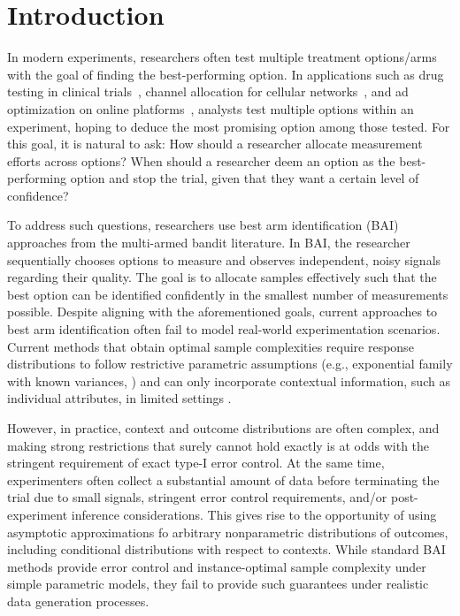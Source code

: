 \documentclass{article}
\begin{document}
\section{Introduction}\label{sec:Intro}

In modern experiments, researchers often test multiple treatment options/arms with the goal of finding the best-performing option. In applications such as drug testing in clinical trials~\citep{bai_healthcare}, channel allocation for cellular networks~\citep{bai}, and ad optimization on online platforms~\citep{bhattacharjee2023bestarmidentificationrare}, analysts test multiple options within an experiment, hoping to deduce the most promising option among those tested. For this goal, it is natural to ask: How should a researcher allocate measurement efforts across options? When should a researcher deem an option as the best-performing option and stop the trial, given that they want a certain level of confidence?

To address such questions, researchers use best arm identification (BAI) approaches from the multi-armed bandit literature. In BAI, the researcher sequentially chooses options to measure and observes independent, noisy signals regarding their quality. The goal is to allocate samples effectively such that the best option can be identified confidently in the smallest number of measurements possible. Despite aligning with the aforementioned goals, current approaches to best arm identification often fail to model real-world experimentation scenarios. Current methods that obtain optimal sample complexities require response distributions to follow restrictive parametric assumptions (e.g., exponential family with known variances, \citealp{garivier2016optimalbestarmidentification, jedra2020optimalbestarmidentificationlinear}) and can only incorporate contextual information, such as individual attributes, in limited settings \citep{kato2024rolecontextualinformationbest}.  


However, in practice, context and outcome distributions are often complex, and making strong restrictions that surely cannot hold exactly is at odds with the stringent requirement of exact type-I error control.
At the same time, experimenters often collect a substantial amount of data before terminating the trial due to small signals, stringent error control requirements, and/or post-experiment inference considerations. This gives rise to the opportunity of using asymptotic approximations fo arbitrary nonparametric distributions of outcomes, including conditional distributions with respect to contexts. While standard BAI methods provide error control and instance-optimal sample complexity under simple parametric models, they fail to provide such guarantees under realistic data generation processes.
\end{document}
